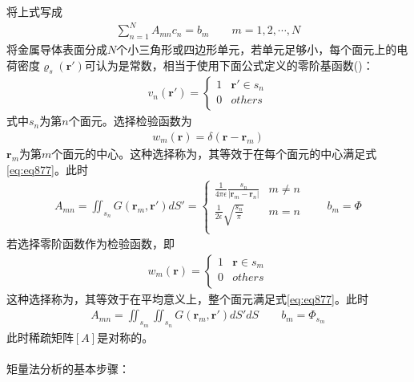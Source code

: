 \documentclass{article}
\numberwithin{equation}{section}
\renewcommand{\vec}[1]{\boldsymbol{#1}}
\begin{document}
将上式写成
\begin{align}
    \label{eq:eq874}
    \sum_{n=1}^{N}A_{mn}c_n=b_m\qquad m=1,2,\cdots,N
\end{align}
将金属导体表面分成$N$个小三角形或四边形单元，若单元足够小，每个面元上的电荷密度$\varrho _s(\vec{r}')$可认为是常数，相当于使用下面公式定义的零阶基函数(\textbf{\color{blue}{脉冲基函数}})：
\begin{align}
    \label{eq:eq875}
    v_n(\vec{r}')=
    \left\{
        \begin{matrix}
            1 & \vec{r}'\in s_n \\
            0 & others \\
        \end{matrix}
    \right.
\end{align}
式中$s_n$为第$n$个面元。选择检验函数为
\begin{align}
    \label{eq:eq876}
    w_m(\vec{r})=\delta(\vec{r}-\vec{r}_m)
\end{align}
$\vec{r}_m$为第$m$个面元的中心。这种选择称为\textbf{\color{blue}{点配置}}，其等效于在每个面元的中心满足式\ref{eq:eq877}。此时
\begin{align}
    \label{eq:eq878}
    A_{mn}=\iint_{s_n}G(\vec{r}_m,\vec{r}')dS'=\left\{
        \begin{matrix}
            \frac{1}{4\pi\epsilon}\frac{s_n}{|\vec{r}_m-\vec{r}_n|} & m\neq n \\
            \frac{1}{2\epsilon}\sqrt{\frac{s_n}{\pi}} & m=n \\
        \end{matrix}
    \right.\qquad b_m=\Phi
\end{align}
若选择零阶函数作为检验函数，即
\begin{align}
    \label{eq:eq879}
    w_m(\vec{r})=
    \left\{
        \begin{matrix}
            1 & \vec{r}\in s_m \\
            0 & others \\
        \end{matrix}
    \right.
\end{align}
这种选择称为\textbf{\color{blue}{子域配置}}，其等效于在平均意义上，整个面元满足式\ref{eq:eq877}。此时
\begin{align}
    \label{eq:eq880}
    A_{mn}=\iint_{s_m}\iint_{s_n}G(\vec{r}_m,\vec{r}')dS'dS\qquad b_{m}=\Phi_{s_m}
\end{align}
此时稀疏矩阵$[A]$是对称的。\\
\\
矩量法分析的基本步骤：\\
\end{document}
